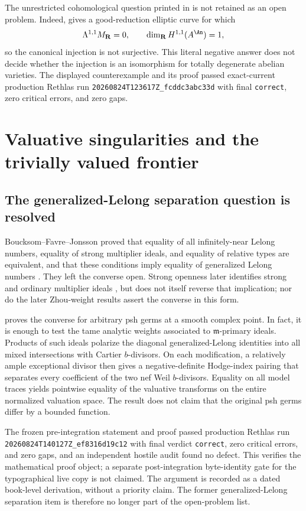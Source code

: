 The unrestricted cohomological question printed in
\cite[\S1.15]{GJR26} is not retained as an open problem.  Indeed,
 gives a good-reduction elliptic
curve for which
\[
 \Lambda^{1,1}M_{\mathbf R}=0,
 \qquad
 \dim_{\mathbf R}H^{1,1}(A^{\An})=1,
\]
so the canonical injection is not surjective.  This literal negative answer
does not decide whether the injection is an isomorphism for totally degenerate
abelian varieties.  The displayed counterexample and its proof passed
exact-current production Rethlas run
\nolinkurl{20260824T123617Z_fcddc3abc33d} with final \texttt{correct}, zero
critical errors, and zero gaps.

\section{Valuative singularities and the trivially valued frontier}

\subsection{The generalized-Lelong separation question is resolved}
\label{sec:resolved-lelong-separation}

Boucksom--Favre--Jonsson proved that equality of all infinitely-near Lelong
numbers, equality of strong multiplier ideals, and equality of relative types
are equivalent, and that these conditions imply equality of generalized
Lelong numbers \cite{BFJ08}.  They left the converse open.  Strong openness
later identifies strong and ordinary multiplier ideals \cite{GZ15}, but does
not itself reverse that implication; nor do the later Zhou-weight results
assert the converse in this form.

 proves the converse for
arbitrary psh germs at a smooth complex point.  In fact, it is enough to
test the tame analytic weights associated to \(\mathfrak m\)-primary ideals.
Products of such ideals polarize the diagonal generalized-Lelong identities
into all mixed intersections with Cartier \(b\)-divisors.  On each
modification, a relatively ample exceptional divisor then gives a
negative-definite Hodge-index pairing that separates every coefficient of the
two nef Weil \(b\)-divisors.  Equality on all model traces yields pointwise
equality of the valuative transforms on the entire normalized valuation
space.  The result does not claim that the original psh germs differ by a
bounded function.

The frozen pre-integration statement and proof passed production Rethlas run
\nolinkurl{20260824T140127Z_ef8316d19c12} with final verdict
\texttt{correct}, zero critical errors, and zero gaps, and an independent
hostile audit found no defect.  This verifies the mathematical proof object;
a separate post-integration byte-identity gate for the typographical live
copy is not claimed.  The argument is recorded as a dated book-level
derivation, without a priority claim.  The former generalized-Lelong
separation item is therefore no longer part of the open-problem list.

